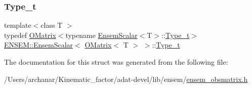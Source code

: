 \subsubsection{\texorpdfstring{Type\_t}{Type\_t}\hspace{0.1cm}{\footnotesize\ttfamily [3/3]}}
{\footnotesize\ttfamily template$<$class T $>$ \\
typedef \mbox{\hyperlink{classENSEM_1_1OMatrix}{O\+Matrix}}$<$typename \mbox{\hyperlink{structENSEM_1_1EnsemScalar}{Ensem\+Scalar}}$<$T$>$\+::\mbox{\hyperlink{structENSEM_1_1EnsemScalar_3_01OMatrix_3_01T_01_4_01_4_ae82c62e546f488affe11e2bd214d3279}{Type\+\_\+t}}$>$ \mbox{\hyperlink{structENSEM_1_1EnsemScalar}{E\+N\+S\+E\+M\+::\+Ensem\+Scalar}}$<$ \mbox{\hyperlink{classENSEM_1_1OMatrix}{O\+Matrix}}$<$ T $>$ $>$\+::\mbox{\hyperlink{structENSEM_1_1EnsemScalar_3_01OMatrix_3_01T_01_4_01_4_ae82c62e546f488affe11e2bd214d3279}{Type\+\_\+t}}}



The documentation for this struct was generated from the following file\+:\begin{DoxyCompactItemize}
\item 
/\+Users/archanar/\+Kinematic\+\_\+factor/adat-\/devel/lib/ensem/\mbox{\hyperlink{adat-devel_2lib_2ensem_2ensem__obsmatrix_8h}{ensem\+\_\+obsmatrix.\+h}}\end{DoxyCompactItemize}
